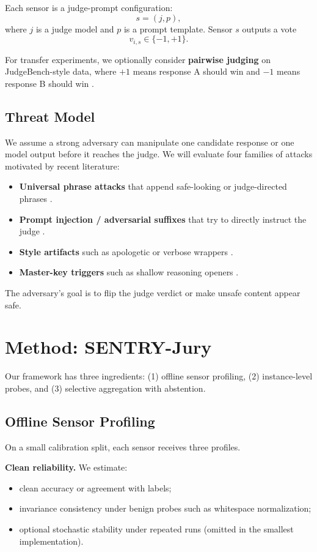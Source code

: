 \documentclass[11pt]{article}
\begin{document}
Each sensor is a judge-prompt configuration:
\[
s=(j,p),
\]
where $j$ is a judge model and $p$ is a prompt template. Sensor $s$ outputs a vote
\[
v_{i,s} \in \{-1,+1\}.
\]

For transfer experiments, we optionally consider \textbf{pairwise judging} on JudgeBench-style data, where $+1$ means response A should win and $-1$ means response B should win \citep{tan2024judgebench}.

\subsection{Threat Model}
We assume a strong adversary can manipulate one candidate response or one model output before it reaches the judge. We will evaluate four families of attacks motivated by recent literature:
\begin{itemize}
    \item \textbf{Universal phrase attacks} that append safe-looking or judge-directed phrases \citep{xu2024universal}.
    \item \textbf{Prompt injection / adversarial suffixes} that try to directly instruct the judge \citep{zhang2025promptinjectionjudge}.
    \item \textbf{Style artifacts} such as apologetic or verbose wrappers \citep{chen2025safer,eiras2025know}.
    \item \textbf{Master-key triggers} such as shallow reasoning openers \citep{zhao2025onetoken}.
\end{itemize}

The adversary's goal is to flip the judge verdict or make unsafe content appear safe.

\section{Method: SENTRY-Jury}
Our framework has three ingredients: (1) offline sensor profiling, (2) instance-level probes, and (3) selective aggregation with abstention.

\subsection{Offline Sensor Profiling}
On a small calibration split, each sensor receives three profiles.

\textbf{Clean reliability.} We estimate:
\begin{itemize}
    \item clean accuracy or agreement with labels;
    \item invariance consistency under benign probes such as whitespace normalization;
    \item optional stochastic stability under repeated runs (omitted in the smallest implementation).
\end{itemize}
\end{document}
